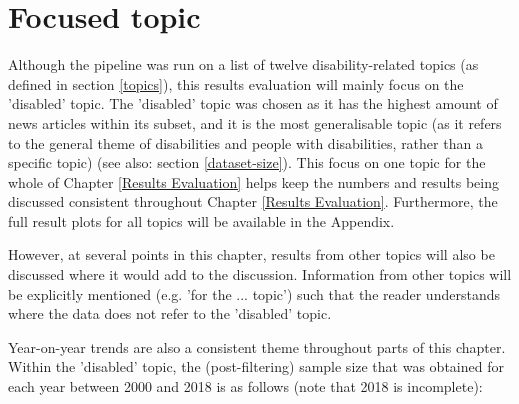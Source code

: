 \documentclass{report}
\begin{document}
\section{Focused topic} \label{Focused topic}
Although the pipeline was run on a list of twelve disability-related topics (as defined in section \ref{topics}), this results evaluation will mainly focus on the 'disabled' topic.
The 'disabled' topic was chosen as it has the highest amount of news articles within its subset, and it is the most generalisable topic (as it refers to the general theme of disabilities and people with disabilities, rather than a specific topic) (see also: section \ref{dataset-size}).
This focus on one topic for the whole of Chapter \ref{Results Evaluation} helps keep the numbers and results being discussed consistent throughout Chapter \ref{Results Evaluation}.
Furthermore, the full result plots for all topics will be available in the Appendix.

However, at several points in this chapter, results from other topics will also be discussed where it would add to the discussion.
Information from other topics will be explicitly mentioned (e.g. 'for the ... topic') such that the reader understands where the data does not refer to the 'disabled' topic.

Year-on-year trends are also a consistent theme throughout parts of this chapter.
Within the 'disabled' topic, the (post-filtering) sample size that was obtained for each year between 2000 and 2018 is as follows (note that 2018 is incomplete):
\end{document}

